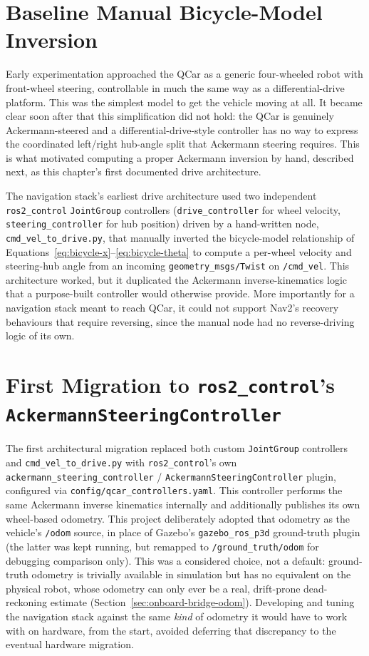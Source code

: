 \section{Baseline Manual Bicycle-Model Inversion}
\label{sec:baseline-manual}

Early experimentation approached the QCar as a generic four-wheeled
robot with front-wheel steering, controllable in much the same way as
a differential-drive platform. This was the simplest model to get the
vehicle moving at all. It became clear soon after that this
simplification did not hold: the QCar is genuinely Ackermann-steered
and a differential-drive-style controller has no way to express the
coordinated left/right hub-angle split that Ackermann steering
requires. This is what motivated computing a proper Ackermann
inversion by hand, described next, as this chapter's first documented
drive architecture.

The navigation stack's earliest drive architecture used two
independent \texttt{ros2\_control} \texttt{JointGroup} controllers
(\texttt{drive\_controller} for wheel velocity,
\texttt{steering\_controller} for hub position) driven by a
hand-written node, \texttt{cmd\_vel\_to\_drive.py}, that manually
inverted the bicycle-model relationship of
Equations~\ref{eq:bicycle-x}--\ref{eq:bicycle-theta} to compute a
per-wheel velocity and steering-hub angle from an incoming
\texttt{geometry\_msgs/Twist} on \texttt{/cmd\_vel}. This
architecture worked, but it duplicated the Ackermann
inverse-kinematics logic that a purpose-built controller would
otherwise provide. More importantly for a navigation stack meant to
reach QCar, it could not support Nav2's recovery
behaviours that require reversing, since the manual node had no
reverse-driving logic of its own.

\section{First Migration to \texttt{ros2\_control}'s \texttt{AckermannSteeringController}}
\label{sec:first-migration}

The first architectural migration replaced both custom
\texttt{JointGroup} controllers and \texttt{cmd\_vel\_to\_drive.py}
with \texttt{ros2\_control}'s own
\texttt{ackermann\_steering\_controller} / \texttt{AckermannSteeringController}
plugin, configured via \texttt{config/qcar\_controllers.yaml}. This
controller performs the same Ackermann inverse kinematics
internally and additionally publishes its own wheel-based odometry.
This project deliberately adopted that odometry as the vehicle's
\texttt{/odom} source, in place of Gazebo's \texttt{gazebo\_ros\_p3d}
ground-truth plugin (the latter was kept running, but remapped to
\texttt{/ground\_truth/odom} for debugging comparison only). This was
a considered choice, not a default: ground-truth odometry is
trivially available in simulation but has no equivalent on the
physical robot, whose odometry can only ever be a real,
drift-prone dead-reckoning estimate (Section~\ref{sec:onboard-bridge-odom}).
Developing and tuning the navigation stack against the same
\emph{kind} of odometry it would have to work with on hardware, from
the start, avoided deferring that discrepancy to the eventual
hardware migration.

